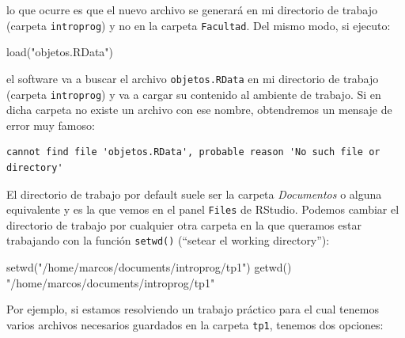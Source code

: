 \documentclass[
]{book}
\newenvironment{Shaded}{\begin{snugshade}}{\end{snugshade}}
\newcommand{\FunctionTok}[1]{\textcolor[rgb]{0.00,0.00,0.00}{#1}}
\newcommand{\NormalTok}[1]{#1}
\newcommand{\StringTok}[1]{\textcolor[rgb]{0.31,0.60,0.02}{#1}}
\begin{document}
lo que ocurre es que el nuevo archivo se generará en mi directorio de trabajo (carpeta \texttt{introprog}) y no en la carpeta \texttt{Facultad}. Del mismo modo, si ejecuto:

\begin{Shaded}
\begin{Highlighting}[]
\FunctionTok{load}\NormalTok{(}\StringTok{"objetos.RData"}\NormalTok{)}
\end{Highlighting}
\end{Shaded}

el software va a buscar el archivo \texttt{objetos.RData} en mi directorio de trabajo (carpeta \texttt{introprog}) y va a cargar su contenido al ambiente de trabajo. Si en dicha carpeta no existe un archivo con ese nombre, obtendremos un mensaje de error muy famoso:

\begin{verbatim}
cannot find file 'objetos.RData', probable reason 'No such file or directory'
\end{verbatim}

El directorio de trabajo por default suele ser la carpeta \emph{Documentos} o alguna equivalente y es la que vemos en el panel \texttt{Files} de RStudio. Podemos cambiar el directorio de trabajo por cualquier otra carpeta en la que queramos estar trabajando con la función \texttt{setwd()} (``setear el working directory''):

\begin{Shaded}
\begin{Highlighting}[]
\FunctionTok{setwd}\NormalTok{(}\StringTok{"/home/marcos/documents/introprog/tp1"}\NormalTok{)}
\FunctionTok{getwd}\NormalTok{()}
\StringTok{"/home/marcos/documents/introprog/tp1"}
\end{Highlighting}
\end{Shaded}

Por ejemplo, si estamos resolviendo un trabajo práctico para el cual tenemos varios archivos necesarios guardados en la carpeta \texttt{tp1}, tenemos dos opciones:
\end{document}

